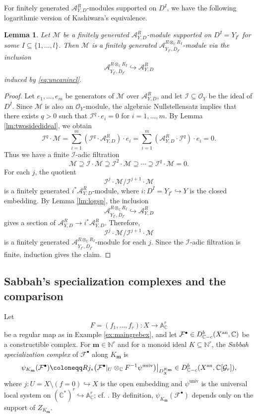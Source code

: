 \documentclass{amsart}
\theoremstyle{plain}
\numberwithin{theorem}{section}
\newtheorem{lemma}[theorem]{Lemma}
\theoremstyle{definition}
\theoremstyle{remark}
\theoremstyle{definition}
\newcommand{\A}{\mathbb{A}}
\newcommand{\C}{\mathbb{C}} %
\newcommand{\N}{\mathbb{N}}
\newcommand{\cF}{\mathcal{F}}
\newcommand{\cG}{\mathcal{G}}
\newcommand{\cI}{\mathcal{I}}
\newcommand{\cM}{\mathcal{M}}
\newcommand{\cO}{\mathscr{O}}
\newcommand{\bm}{\mathbf{m}}
\newcommand{\sA}{\mathscr{A}}
\newcommand{\an}{\textup{an}}
\begin{document}
For finitely generated $\sA^R_{Y,D}$-modules supported on $D^I$, we have the
following logarithmic version of Kashiwara's equivalence.

\begin{lemma}\label{lm:logKashequiv}
Let $\cM$ be a finitely generated $\sA^R_{Y,D}$-module supported on
$D^I=Y_{I^c}$
for some $I\subseteq \{1,\dots,l\}$. Then $\cM$ is a finitely generated
$\sA_{Y_{I^c},\bar D_{I^c}}^{R\otimes_\C R_I}$-module via the inclusion
\[
\sA_{Y_{I^c},\bar D_{I^c}}^{R\otimes_\C R_I}
\hookrightarrow
\sA^R_{Y,D}
\]
induced by \eqref{eq:uncanincl}.
\end{lemma}

\begin{proof}
Let $e_1,\dots,e_m$ be generators of $\cM$ over $\sA^R_{Y,D}$, and let
$\cI\subseteq \cO_Y$ be the ideal of $D^I$. Since $\cM$ is also an
$\cO_Y$-module, the algebraic Nullstellensatz implies that there exists
$q>0$ such that
$\cI^q\cdot e_i=0$
for $i=1,\dots,m$. By Lemma \ref{lm:twosidedideal}, we obtain
\[
\cI^q\cdot \cM
=
\sum_{i=1}^m(\cI^q\cdot \sA^R_{Y,D})\cdot e_i
=
\sum_{i=1}^m(\sA^R_{Y,D}\cdot \cI^q)\cdot e_i
=
0.
\]
Thus we have a finite $\cI$-adic filtration
\[
\cM
\supseteq
\cI\cdot\cM
\supseteq
\cI^2\cdot\cM
\supseteq
\cdots
\supseteq
\cI^q\cdot\cM
=
0.
\]
For each $j$, the quotient
\[
\cI^j\cdot\cM/\cI^{j+1}\cdot\cM
\]
is a finitely generated $i^*\sA^R_{Y,D}$-module, where
$i\colon D^I=Y_{I^c}\hookrightarrow Y$
is the closed embedding. By Lemma \ref{lm:logsp}, the inclusion
\[
\sA_{Y_{I^c},\bar D_{I^c}}^{R\otimes_\C R_I}
\hookrightarrow
\sA^R_{Y,D}
\]
gives a section of
$\sA^R_{Y,D}\to i^*\sA^R_{Y,D}.$
Therefore,
\[
\cI^j\cdot\cM/\cI^{j+1}\cdot\cM
\]
is a finitely generated
$\sA_{Y_{I^c},\bar D_{I^c}}^{R\otimes_\C R_I}$-module for each $j$. Since
the $\cI$-adic filtration is finite, induction gives the claim.
\end{proof}


\subsection{Sabbah's specialization complexes and the comparison}
\label{subsect:SabSp}

Let
\[
F=(f_1,\dots,f_r)\colon X\to \A^r_\C
\]
be a regular map as in Example \ref{ex:maingrebex}, and let
$\cF^\bullet\in D^b_{\C-c}(X^\an,\C)$
be a constructible complex. For $\bm\in \N^r$ and for a monoid ideal
$K\subseteq \N^r$, the \emph{Sabbah specialization complex} of
$\cF^\bullet$ along $K_\bm$ is
\[
\psi_{K_\bm}(\cF^\bullet)
\coloneqq
Rj_*\big(\cF^\bullet|_U\otimes_\C F^{-1}\psi^{\mathrm{univ}}\big)
\big|_{D_X^{K_\bm}}
\in
D^b_{\C-c}(X^\an,\C[\cG_r]),
\]
where
$j\colon U=X\setminus(f=0)\hookrightarrow X$
is the open embedding and $\psi^{\mathrm{univ}}$ is the universal local system
on
$(\C^*)^r\hookrightarrow \A^r_\C$;
cf. \cite[\S 3.1]{WuRHA}. By definition,
$\psi_{K_\bm}(\cF^\bullet)$ depends only on the support of $Z_{K_\bm}$.
\end{document}
